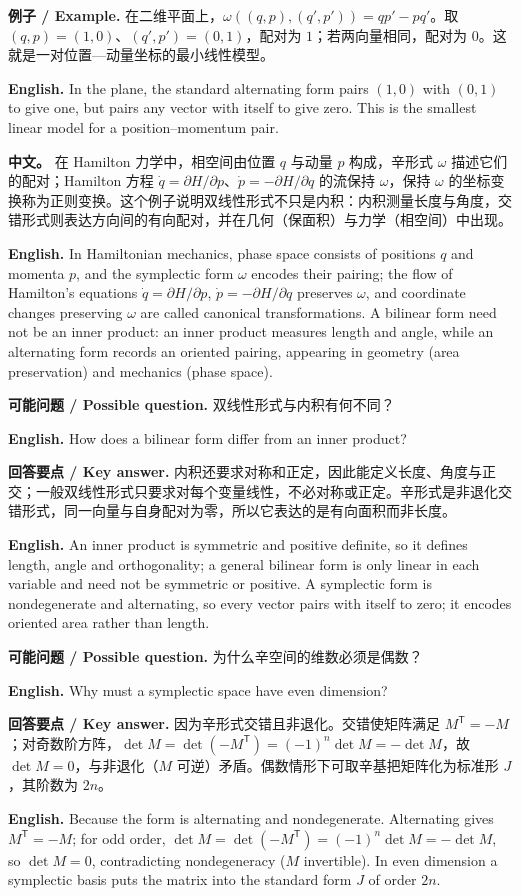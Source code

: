 \documentclass[UTF8,11pt,a4paper]{ctexart}
\newcommand{\EN}[1]{\par\noindent\textbf{English.} #1\par}
\newcommand{\EX}[2]{\par\noindent\textbf{例子 / Example.} #1\par\EN{#2}}
\newcommand{\ASK}[4]{\par\noindent\textbf{可能问题 / Possible question.} #1\par\EN{#2}\noindent\textbf{回答要点 / Key answer.} #3\par\EN{#4}\medskip}
\newcommand{\APS}[2]{\par\noindent\textbf{中文。} #1\par\noindent\textbf{English.} #2\par\smallskip}
\begin{document}
\EX{在二维平面上，$\omega((q,p),(q',p'))=qp'-pq'$。取 $(q,p)=(1,0)$、$(q',p')=(0,1)$，配对为 $1$；若两向量相同，配对为 $0$。这就是一对位置—动量坐标的最小线性模型。}{In the plane, the standard alternating form pairs $(1,0)$ with $(0,1)$ to give one, but pairs any vector with itself to give zero. This is the smallest linear model for a position--momentum pair.}
\APS{在 Hamilton 力学中，相空间由位置 $q$ 与动量 $p$ 构成，辛形式 $\omega$ 描述它们的配对；Hamilton 方程 $\dot q=\partial H/\partial p$、$\dot p=-\partial H/\partial q$ 的流保持 $\omega$，保持 $\omega$ 的坐标变换称为正则变换。这个例子说明双线性形式不只是内积：内积测量长度与角度，交错形式则表达方向间的有向配对，并在几何（保面积）与力学（相空间）中出现。}{In Hamiltonian mechanics, phase space consists of positions $q$ and momenta $p$, and the symplectic form $\omega$ encodes their pairing; the flow of Hamilton's equations $\dot q=\partial H/\partial p$, $\dot p=-\partial H/\partial q$ preserves $\omega$, and coordinate changes preserving $\omega$ are called canonical transformations. A bilinear form need not be an inner product: an inner product measures length and angle, while an alternating form records an oriented pairing, appearing in geometry (area preservation) and mechanics (phase space).}
\ASK{双线性形式与内积有何不同？}{How does a bilinear form differ from an inner product?}{内积还要求对称和正定，因此能定义长度、角度与正交；一般双线性形式只要求对每个变量线性，不必对称或正定。辛形式是非退化交错形式，同一向量与自身配对为零，所以它表达的是有向面积而非长度。}{An inner product is symmetric and positive definite, so it defines length, angle and orthogonality; a general bilinear form is only linear in each variable and need not be symmetric or positive. A symplectic form is nondegenerate and alternating, so every vector pairs with itself to zero; it encodes oriented area rather than length.}
\ASK{为什么辛空间的维数必须是偶数？}{Why must a symplectic space have even dimension?}{因为辛形式交错且非退化。交错使矩阵满足 $M^{\mathsf T}=-M$；对奇数阶方阵，$\det M=\det(-M^{\mathsf T})=(-1)^n\det M=-\det M$，故 $\det M=0$，与非退化（$M$ 可逆）矛盾。偶数情形下可取辛基把矩阵化为标准形 $J$，其阶数为 $2n$。}{Because the form is alternating and nondegenerate. Alternating gives $M^{\mathsf T}=-M$; for odd order, $\det M=\det(-M^{\mathsf T})=(-1)^n\det M=-\det M$, so $\det M=0$, contradicting nondegeneracy ($M$ invertible). In even dimension a symplectic basis puts the matrix into the standard form $J$ of order $2n$.}
\end{document}
